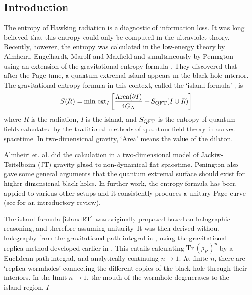 \documentclass[11pt,oneside,letterpaper]{article}
\newcommand{\f}{\frac}
\newcommand{\be}{\begin{equation}}
\newcommand{\ee}{\end{equation}}
\def\be{\begin{eqnarray}}
\def\ee{\end{eqnarray}}
\newcommand{\tr}{\textrm{Tr}\,}
\let\f=\frac
\def\be{\begin{equation}}
\def\ee{\end{equation}}
\numberwithin{equation}{section}
\def\pp{\partial}
\def\be{\begin{equation}}
\def\ee{\end{equation}}
\def\f {\frac}
\def \be {\begin{equation}}
\def \ee {\end{equation}}
\newcommand{\ext}{\mbox{ext}}
\newcommand{\Ssemi}{S_{\rm QFT}}
\renewcommand{\min}{{\rm min}}
\begin{document}
\tableofcontents

\newpage
\begin{spacing}{1.1}

\section{Introduction}

The entropy of Hawking radiation is a diagnostic of information loss. It was long believed that this entropy could only be computed in the ultraviolet theory. Recently, however, the entropy was calculated in the low-energy theory by Almheiri, Engelhardt, Marolf and Maxfield \cite{Almheiri:2019psf} and simultaneously by Penington \cite{Penington:2019npb} using an extension of the gravitational entropy formula \cite{Penington:2019npb,Almheiri:2019psf, Ryu:2006bv, Hubeny:2007xt, Lewkowycz:2013nqa, Barrella:2013wja, Faulkner:2013ana, Engelhardt:2014gca}. They discovered that after the Page time, a quantum extremal island appears in the black hole interior. The gravitational entropy formula in this context, called the `island formula' \cite{Almheiri:2019hni}, is
\be\label{islandRT}
S(R) = \min \; \ext_I \left[ \f{\mbox{Area}(\pp{I})}{4G_N}+\Ssemi(I\cup R)  \right]
\ee
where $R$ is the radiation, $I$ is the island, and $\Ssemi$ is the entropy of quantum fields calculated by the traditional methods of quantum field theory in curved spacetime. In two-dimensional gravity, `Area' means the value of the dilaton. 

Almheiri et. al. \cite{Almheiri:2019psf} did the calculation in a two-dimensional model of Jackiw-Teitelboim (JT) gravity \cite{JACKIW1985343,TEITELBOIM198341} glued to non-dynamical flat spacetime. Penington \cite{Penington:2019npb} also gave some general arguments that the quantum extremal surface should exist for higher-dimensional black holes. In further work, the entropy formula has  been applied to various other setups and it consistently produces a unitary Page curve \cite{Almheiri:2019hni, Almheiri:2019yqk, Almheiri:2019qdq, Penington:2019kki, Hartman:2020swn, Hartman:2020khs,Chen:2020tes,Chen:2020uac,Chen:2020jvn,Chen:2020hmv ,Balasubramanian:2020xqf,Hollowood:2020cou,Hollowood:2020kvk,Geng:2020qvw,Alishahiha:2020qza,Hashimoto:2020cas,Anegawa:2020ezn,Gautason:2020tmk } (see \cite{Almheiri:2020cfm} for an introductory review).

The island formula \eqref{islandRT} was originally proposed based on holographic reasoning, and therefore assuming unitarity. It was then derived without holography from the gravitational path integral in \cite{Almheiri:2019qdq,Penington:2019kki}, using the gravitational replica method  developed earlier in \cite{Lewkowycz:2013nqa, Dong:2016hjy}. This entails calculating $\tr (\rho_R)^n$ by a Euclidean path integral, and analytically continuing $n\to 1$. At finite $n$, there are `replica wormholes' connecting the different copies of the black hole through their interiors. In the limit $n \to 1$, the mouth of the wormhole degenerates to the island region, $I$.  



\end{spacing}
\end{document}
